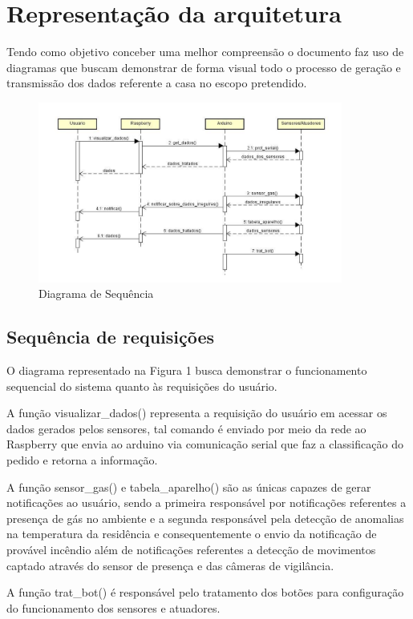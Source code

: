 \section{Representação da arquitetura}
\par Tendo como objetivo conceber uma melhor compreensão o documento faz uso de diagramas que buscam demonstrar de forma visual todo o processo de geração e transmissão dos dados referente a casa no escopo pretendido.

\begin{figure}[!h]
\caption{Diagrama de Sequência}
\centering
\includegraphics[width=10cm]{figuras/representacao_arquitetura}
\end{figure}

\subsection{Sequência de requisições}

\par O diagrama representado na Figura 1 busca demonstrar o funcionamento sequencial do sistema quanto às requisições do usuário.
\par A função visualizar\_dados() representa a requisição do usuário em acessar os dados gerados pelos sensores, tal comando é enviado por meio da rede ao Raspberry que envia ao arduino via comunicação serial que faz a classificação do pedido e retorna a informação.
\par A função sensor\_gas() e tabela\_aparelho() são as únicas capazes de gerar notificações ao usuário, sendo a primeira responsável por notificações referentes a presença de gás no ambiente e a segunda responsável pela detecção de anomalias na temperatura da residência e consequentemente o envio da notificação de provável incêndio além de notificações referentes a detecção de movimentos captado através do sensor de presença e das câmeras de vigilância.
\par A função trat\_bot() é responsável pelo tratamento dos botões para configuração do funcionamento dos sensores e atuadores.

